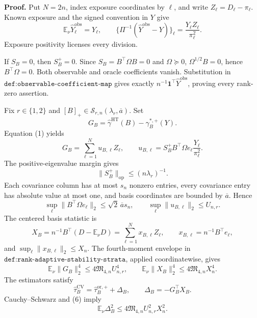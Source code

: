 \textbf{Proof.}
Put \(N=2n\), index exposure coordinates by \(\ell\), and write \(Z_\ell=D_\ell-\pi_\ell\).  Known exposure and the signed convention in \(Y\) give
\[
\mathbb E_\nu\widehat Y_\ell^{\mathrm{obs}}=Y_\ell,
\qquad
\{\Pi^{-1}(\widehat Y^{\mathrm{obs}}-Y)\}_\ell
=\frac{Y_\ell Z_\ell}{\pi_\ell^2}.
\tag{1}
\]
Exposure positivity licenses every division.

If \(S_B=0\), then \(S_B^+=0\).  Since \(S_B=B^{\top}\Omega B=0\) and \(\Omega\succeq0\), \(\Omega^{1/2}B=0\), hence \(B^{\top}\Omega=0\).  Both observable and oracle coefficients vanish.  Substitution in \(\texttt{def:observable-coefficient-map}\) gives exactly \(n^{-1}\mathbf1^{\top}\widehat Y^{\mathrm{obs}}\), proving every rank-zero assertion.

Fix \(r\in\{1,2\}\) and \([B]_+\in\mathcal S_{r,n}(\lambda_r,\overline a)\).  Set
\[
G_B=\widehat\gamma^{\mathrm{HT}}(B)-\gamma_B^{*,+}(Y).
\]
Equation (1) yields
\[
G_B=\sum_{\ell=1}^{N}u_{B,\ell}Z_\ell,
\qquad
u_{B,\ell}=S_B^+B^{\top}\Omega e_\ell\frac{Y_\ell}{\pi_\ell^2}.
\tag{2}
\]
The positive-eigenvalue margin gives
\[
\lVert S_B^+\rVert_{\mathrm{op}}\le(n\lambda_r)^{-1}.
\tag{3}
\]
Each covariance column has at most \(s_n\) nonzero entries, every covariance entry has absolute value at most one, and basis coordinates are bounded by \(\overline a\).  Hence
\[
\sup_\ell\lVert B^{\top}\Omega e_\ell\rVert_2
\le\sqrt2\,\overline a s_n,
\qquad
\sup_\ell\lVert u_{B,\ell}\rVert_2\le U_{n,r}.
\tag{4}
\]
The centered basis statistic is
\[
X_B=n^{-1}B^{\top}(D-\mathbb E_\nu D)
=\sum_{\ell=1}^{N}x_{B,\ell}Z_\ell,
\qquad x_{B,\ell}=n^{-1}B^{\top}e_\ell,
\tag{5}
\]
and \(\sup_\ell\lVert x_{B,\ell}\rVert_2\le X_n\).  The fourth-moment envelope in \(\texttt{def:rank-adaptive-stability-strata}\), applied coordinatewise, gives
\[
\mathbb E_\nu\lVert G_B\rVert_2^4
\le4\mathfrak M_{4,n}U_{n,r}^4,
\qquad
\mathbb E_\nu\lVert X_B\rVert_2^4
\le4\mathfrak M_{4,n}X_n^4.
\tag{6}
\]
The estimators satisfy
\[
\widehat\tau_B^{\mathrm{CV}}
=\widehat\tau_B^{\mathrm{or},+}+\Delta_B,
\qquad \Delta_B=-G_B^{\top}X_B.
\tag{7}
\]
Cauchy--Schwarz and (6) imply
\[
\mathbb E_\nu\Delta_B^2
\le4\mathfrak M_{4,n}U_{n,r}^2X_n^2.
\tag{8}
\]

